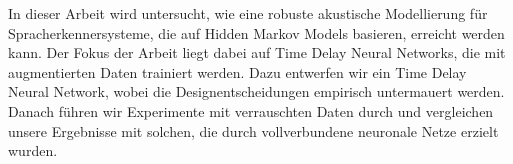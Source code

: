 
\abstract
In dieser Arbeit wird untersucht, wie eine robuste akustische Modellierung für Spracherkennersysteme, die auf Hidden Markov Models basieren, erreicht werden kann. Der Fokus der Arbeit liegt dabei auf Time Delay Neural Networks, die mit augmentierten Daten trainiert werden. Dazu entwerfen wir ein Time Delay Neural Network, wobei die Designentscheidungen empirisch untermauert werden. Danach führen wir Experimente mit verrauschten Daten durch und vergleichen unsere Ergebnisse mit solchen, die durch vollverbundene neuronale Netze erzielt wurden. 